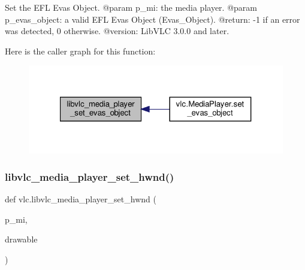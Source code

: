 \begin{DoxyVerb}Set the EFL Evas Object.
@param p_mi: the media player.
@param p_evas_object: a valid EFL Evas Object (Evas_Object).
@return: -1 if an error was detected, 0 otherwise.
@version: LibVLC 3.0.0 and later.
\end{DoxyVerb}
 Here is the caller graph for this function\+:
\nopagebreak
\begin{figure}[H]
\begin{center}
\leavevmode
\includegraphics[width=321pt]{namespacevlc_a1ba42eb92d2829216be25aa31ec8982d_icgraph}
\end{center}
\end{figure}
\mbox{\label{namespacevlc_a7b6f415070dbcd8fc7e50311853bbb26}} 
\subsubsection{\texorpdfstring{libvlc\+\_\+media\+\_\+player\+\_\+set\+\_\+hwnd()}{libvlc\_media\_player\_set\_hwnd()}}
{\footnotesize\ttfamily def vlc.\+libvlc\+\_\+media\+\_\+player\+\_\+set\+\_\+hwnd (\begin{DoxyParamCaption}\item[{}]{p\+\_\+mi,  }\item[{}]{drawable }\end{DoxyParamCaption})}

